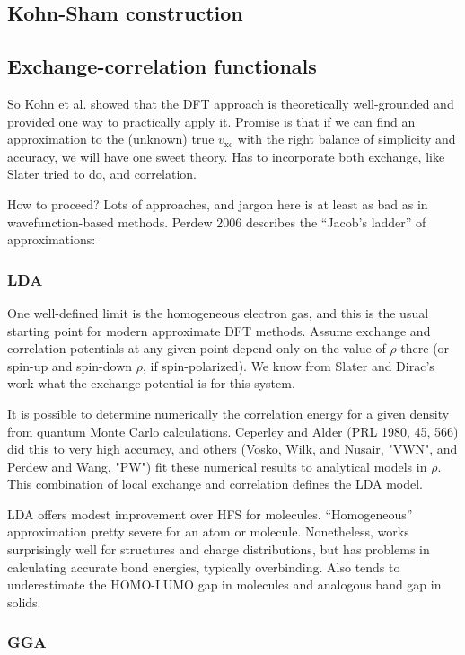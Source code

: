 \documentclass[11pt]{article}
\begin{document}
\subsection{Kohn-Sham construction}
\label{sec-14-5}
\subsection{Exchange-correlation functionals}
\label{sec-14-6}
So Kohn et al. showed that the DFT approach is theoretically well-grounded and
provided one way to practically apply it. Promise is that if we can find an
approximation to the (unknown) true \(v_\text{xc}\) with the right balance of simplicity
and accuracy, we will have one sweet theory. Has to incorporate both exchange,
like Slater tried to do, and correlation.

How to proceed? Lots of approaches, and jargon here is at least as bad as in
wavefunction-based methods. Perdew 2006 describes the ``Jacob's ladder'' of
approximations:
\subsubsection{LDA}
\label{sec-14-6-1}
One well-defined limit is the homogeneous electron gas, and this is the usual
starting point for modern approximate DFT methods. Assume exchange and
correlation potentials at any given point depend only on the value of $\rho$ there
(or spin-up and spin-down $\rho$, if spin-polarized). We know from Slater and
Dirac's work what the exchange potential is for this system.

It is possible to determine numerically the correlation energy for a given
density from quantum Monte Carlo calculations. Ceperley and Alder (PRL 1980,
45, 566) did this to very high accuracy, and others (Vosko, Wilk, and Nusair,
"VWN", and Perdew and Wang, "PW") fit these numerical results to analytical
models in $\rho$. This combination of local exchange and correlation defines the LDA
model.

LDA offers modest improvement over HFS for molecules. ``Homogeneous''
approximation pretty severe for an atom or molecule. Nonetheless, works
surprisingly well for structures and charge distributions, but has problems in
calculating accurate bond energies, typically overbinding. Also tends to
underestimate the HOMO-LUMO gap in molecules and analogous band gap in solids.

\subsubsection{GGA}
\label{sec-14-6-2}
\end{document}
